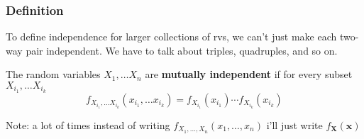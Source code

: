 \documentclass{beamer}
\begin{document}
\begin{frame}
\frametitle{Definition}

To define independence for larger collections of rvs, we can't just make each two-way pair independent. We have to talk about triples, quadruples, and so on. 
\newline

The random variables $X_1, \ldots X_n$ are \textbf{mutually independent} if for every subset $X_{i_1}, \ldots X_{i_k}$
\[
f_{X_{i_1}, \ldots X_{i_k}}(x_{i_1}, \ldots x_{i_k}) = f_{X_{i_1}} (x_{i_1}) \cdots f_{X_{i_k}}(x_{i_k})
\]
\pause

Note: a lot of times instead of writing $f_{X_1, \ldots, X_n}(x_1, \ldots, x_n)$ i'll just write $f_{\mathbf{X}}(\mathbf{x})$


\end{frame}
\end{document}
